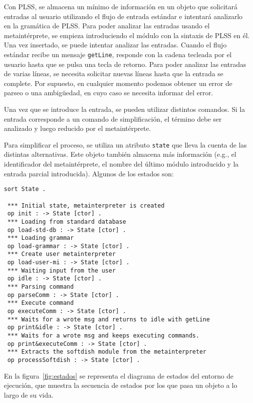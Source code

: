 Con PLSS, se almacena un mínimo de información en un objeto que solicitará entradas al usuario utilizando el flujo de entrada estándar e intentará analizarlo en la gramática de PLSS. Para poder analizar las entradas usando el metaintérprete, se empieza introduciendo el módulo con la sintaxis de PLSS en él. Una vez insertado, se puede intentar analizar las entradas. Cuando el flujo estándar recibe un mensaje \texttt{getLine}, responde con la cadena tecleada por el usuario hasta que se pulsa una tecla de retorno. Para poder analizar las entradas de varias líneas, se necesita solicitar nuevas líneas hasta que la entrada se complete. Por supuesto, en cualquier momento podemos obtener un error de parseo o una ambigüedad, en cuyo caso se necesita informar del error.
\smallskip

Una vez que se introduce la entrada, se pueden utilizar distintos comandos. 
Si la entrada corresponde a un comando de simplificación, el término debe ser analizado y luego reducido por el metaintérprete.
\smallskip

Para simplificar el proceso, se utiliza un atributo \texttt{state} que lleva la cuenta de las distintas alternativas. 
Este objeto también almacena más información (e.g., el identificador del metaintérprete, el nombre del último módulo introducido y la entrada parcial introducida).
%
Algunos de los estados son:
\begin{lstlisting}[language=Maude]
 sort State .

 *** Initial state, metainterpreter is created
 op init : -> State [ctor] .
 *** Loading from standard database
 op load-std-db : -> State [ctor] .
 *** Loading grammar
 op load-grammar : -> State [ctor] .
 *** Create user metainterpreter
 op load-user-mi : -> State [ctor] .
 *** Waiting input from the user
 op idle : -> State [ctor] .
 *** Parsing command
 op parseComm : -> State [ctor] .
 *** Execute command
 op executeComm : -> State [ctor] .
 *** Waits for a wrote msg and returns to idle with getLine
 op print&idle : -> State [ctor] .
 *** Waits for a wrote msg and keeps executing commands.
 op print&executeComm : -> State [ctor] .
 *** Extracts the softdish module from the metainterpreter
 op processSoftdish : -> State [ctor] .
\end{lstlisting}
\smallskip

En la figura~\ref{fig:estados} se representa el diagrama de estados del entorno de ejecución, que muestra la secuencia de estados por los que pasa un objeto a lo largo de su vida.
\smallskip


